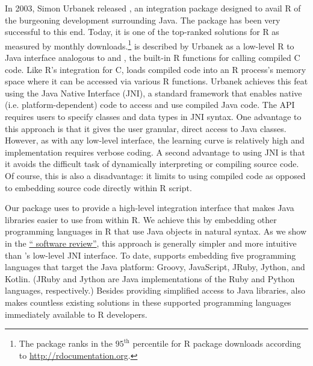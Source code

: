 In 2003, Simon Urbanek released  \citeyearpar{rjava}, an integration package designed to avail R of the burgeoning development surrounding Java. The package has been very successful to this end. Today, it is one of the top-ranked solutions for R as measured by monthly downloads.\footnote{The  package ranks in the $95^{\text{th}}$ percentile for R package downloads according to \url{http://rdocumentation.org}.}  is described by Urbanek as a low-level R to Java interface analogous to  and , the built-in R functions for calling compiled C code. Like R's integration for C,  loads compiled code into an R process's memory space where it can be accessed via various R functions. Urbanek achieves this feat using the Java Native Interface (JNI), a standard framework that enables native (i.e. platform-dependent) code to access and use compiled Java code. The  API requires users to specify classes and data types in JNI syntax. One advantage to this approach is that it gives the user granular, direct access to Java classes. However, as with any low-level interface, the learning curve is relatively high and implementation requires verbose coding. A second advantage to using JNI is that it avoids the difficult task of dynamically interpreting or compiling source code. Of course, this is also a disadvantage: it limits  to using compiled code as opposed to embedding source code directly within R script.

Our  package uses  to provide a high-level integration interface that makes Java libraries easier to use from within R. We achieve this by embedding other programming languages in R that use Java objects in natural syntax. As we show in the \hyperlink{rjava-software-review}{`` software review''}, this approach is generally simpler and more intuitive than 's low-level JNI interface. To date,  supports embedding five programming languages that target the Java platform: Groovy, JavaScript, JRuby, Jython, and Kotlin. (JRuby and Jython are Java implementations of the Ruby and Python languages, respectively.) Besides providing simplified access to Java libraries,  also makes countless existing solutions in these supported programming languages immediately available to R developers.


